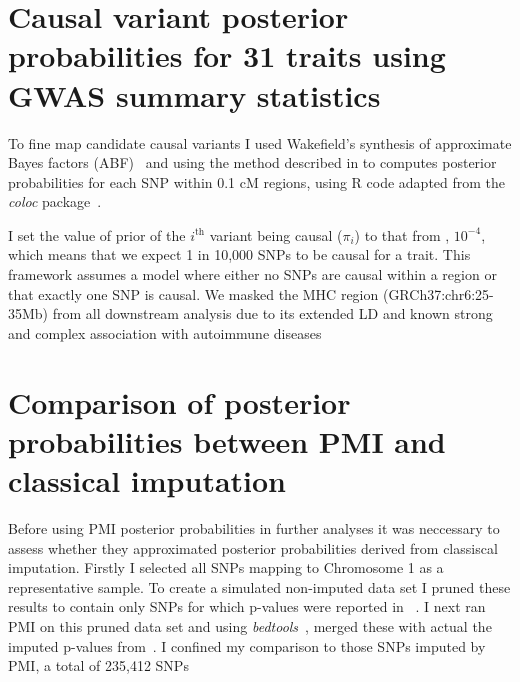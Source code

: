 \documentclass[a4paper,11pt]{report}
\begin{document}
\section{Causal variant posterior probabilities for 31 traits using GWAS summary statistics}
To fine map candidate causal variants I used Wakefield's synthesis of approximate Bayes factors (ABF)~\citep{Wakefield2009} and using the method described in \citet{The_Wellcome_Trust_Case_Control_Consortium2012-ad} to computes posterior probabilities for each SNP within 0.1 cM regions, using R code adapted from the \textit{coloc} package~\citep{GiambartolomeiVukcevicSchadtEtAl2014}.  

I set the value of prior of the $i^\text{th}$ variant being causal ($\pi_{i}$) to that from \citet{GiambartolomeiVukcevicSchadtEtAl2014}, $10^{-4}$, which means that we expect 1 in 10,000 SNPs to be causal for a trait. This framework assumes a model where either no SNPs are causal within a region or that exactly one SNP is causal. We masked the MHC region (GRCh37:chr6:25-35Mb) from all downstream analysis due to its extended LD and known strong and complex association with autoimmune diseases

\section{Comparison of posterior probabilities between PMI and classical imputation}
Before using PMI posterior probabilities in further analyses it was neccessary to assess whether they approximated posterior probabilities derived from classiscal imputation. Firstly I selected all SNPs mapping to Chromosome 1 as a representative sample. To create a simulated non-imputed data set I pruned these results to contain only SNPs for which p-values were reported in ~\citet{Stahl2010-wz}. I next ran PMI on this pruned data set and using \textit{bedtools}~\citep{Quinlan2014}, merged these with actual the imputed p-values from~\citet{Okada2014-um}. I confined my comparison to those SNPs imputed by PMI, a total of 235,412 SNPs

\

\end{document}
